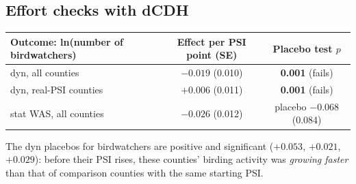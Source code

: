 \documentclass[11pt]{article}
\begin{document}
\subsection{Effort checks with dCDH}
\begin{center}\small
\begin{tabular}{l c c}
\toprule
Outcome: ln(number of birdwatchers) & Effect per PSI point (SE) & Placebo test $p$ \\
\midrule
dyn, all counties & $-0.019$ (0.010) & \textbf{0.001} (fails) \\
dyn, real-PSI counties & $+0.006$ (0.011) & \textbf{0.001} (fails) \\
stat WAS, all counties & $-0.026$ (0.012) & placebo $-0.068$ (0.084) \\
\bottomrule
\end{tabular}
\end{center}
The dyn placebos for birdwatchers are positive and significant ($+0.053$, $+0.021$, $+0.029$): before their PSI rises, these counties' birding activity was \emph{growing faster} than that of comparison counties with the same starting PSI.
\end{document}
